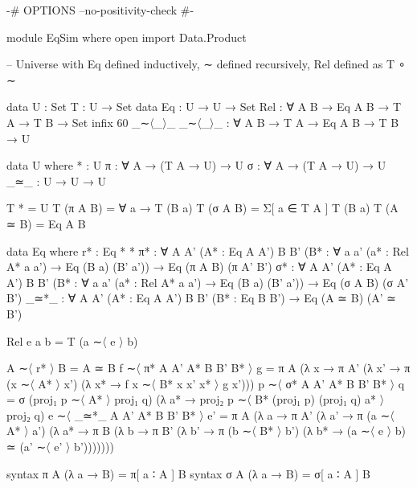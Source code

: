 {-# OPTIONS --no-positivity-check #-}

module EqSim where
open import Data.Product

-- Universe with Eq defined inductively, ∼ defined recursively, Rel defined as T ∘ ∼

data U : Set
T : U → Set
data Eq : U → U → Set
Rel : ∀ {A} {B} → Eq A B → T A → T B → Set
infix 60 _∼〈_〉_
_∼〈_〉_ : ∀ {A} {B} → T A → Eq A B → T B → U

data U where
    * : U
    π : ∀ A → (T A → U) → U
    σ : ∀ A → (T A → U) → U
    _≃_ : U → U → U

T * = U
T (π A B) = ∀ a → T (B a)
T (σ A B) = Σ[ a ∈ T A ] T (B a)
T (A ≃ B) = Eq A B

data Eq where
    r* : Eq * *
    π* : ∀ {A} {A'} (A* : Eq A A')
           {B} {B'} (B* : ∀ a a' (a* : Rel A* a a') → Eq (B a) (B' a')) →
           Eq (π A B) (π A' B')
    σ* : ∀ {A} {A'} (A* : Eq A A')
           {B} {B'} (B* : ∀ a a' (a* : Rel A* a a') → Eq (B a) (B' a')) →
           Eq (σ A B) (σ A' B')
    _≃*_ : ∀ {A} {A'} (A* : Eq A A') {B} {B'} (B* : Eq B B') → 
           Eq (A ≃ B) (A' ≃ B')

Rel e a b = T (a ∼〈 e 〉 b)

A ∼〈 r* 〉 B = A ≃ B
f ∼〈 π* {A} {A'} A* {B} {B'} B* 〉 g = π A (λ x → π A' (λ x' → 
  π (x ∼〈 A* 〉 x') (λ x* → f x ∼〈 B* x x' x* 〉 g x')))
p ∼〈 σ* {A} {A'} A* {B} {B'} B* 〉 q = σ (proj₁ p ∼〈 A* 〉 proj₁ q) 
  (λ a* → proj₂ p ∼〈 B* (proj₁ p) (proj₁ q) a* 〉 proj₂ q)
e ∼〈 _≃*_ {A} {A'} A* {B} {B'} B* 〉 e' = 
  π A (λ a → π A' (λ a' → π (a ∼〈 A* 〉 a') (λ a* → 
  π B (λ b → π B' (λ b' → π (b ∼〈 B* 〉 b') (λ b* → 
  (a ∼〈 e 〉 b) ≃ (a' ∼〈 e' 〉 b')))))))

syntax π A (λ a → B) = π[ a ∶ A ] B
syntax σ A (λ a → B) = σ[ a ∶ A ] B


